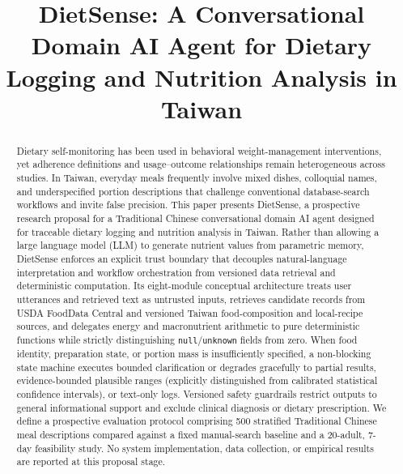 \documentclass[conference]{IEEEtran}
\begin{document}
\title{DietSense: A Conversational Domain AI Agent for Dietary Logging and Nutrition Analysis in Taiwan}

\author{
}

\maketitle

\begin{abstract}
Dietary self-monitoring has been used in behavioral weight-management interventions, yet adherence definitions and usage--outcome relationships remain heterogeneous across studies. In Taiwan, everyday meals frequently involve mixed dishes, colloquial names, and underspecified portion descriptions that challenge conventional database-search workflows and invite false precision. This paper presents DietSense, a prospective research proposal for a Traditional Chinese conversational domain AI agent designed for traceable dietary logging and nutrition analysis in Taiwan. Rather than allowing a large language model (LLM) to generate nutrient values from parametric memory, DietSense enforces an explicit trust boundary that decouples natural-language interpretation and workflow orchestration from versioned data retrieval and deterministic computation. Its eight-module conceptual architecture treats user utterances and retrieved text as untrusted inputs, retrieves candidate records from USDA FoodData Central and versioned Taiwan food-composition and local-recipe sources, and delegates energy and macronutrient arithmetic to pure deterministic functions while strictly distinguishing \texttt{null}/\texttt{unknown} fields from zero. When food identity, preparation state, or portion mass is insufficiently specified, a non-blocking state machine executes bounded clarification or degrades gracefully to partial results, evidence-bounded plausible ranges (explicitly distinguished from calibrated statistical confidence intervals), or text-only logs. Versioned safety guardrails restrict outputs to general informational support and exclude clinical diagnosis or dietary prescription. We define a prospective evaluation protocol comprising 500 stratified Traditional Chinese meal descriptions compared against a fixed manual-search baseline and a 20-adult, 7-day feasibility study. No system implementation, data collection, or empirical results are reported at this proposal stage.
\end{abstract}
\end{document}
